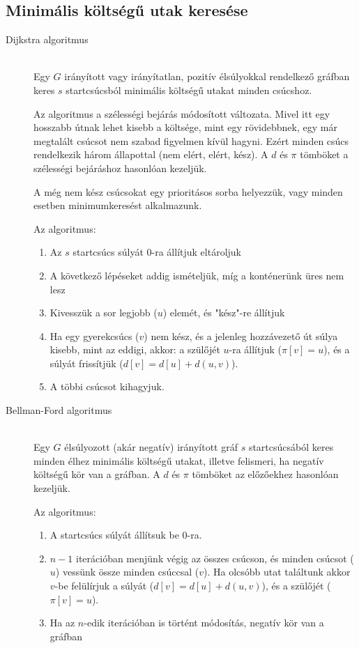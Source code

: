 \documentclass[margin=0px]{article}
\begin{document}
\subsection{Minimális költségű utak keresése}
\begin{description}
    \item[Dijkstra algoritmus] \hfill \\
        Egy $G$ irányított vagy irányítatlan, pozitív élsúlyokkal rendelkező gráfban keres $s$ startcsúcsból minimális költségű utakat minden csúcshoz.

        Az algoritmus a szélességi bejárás módosított változata. Mivel itt egy hosszabb útnak lehet kisebb a költsége, mint egy rövidebbnek, egy már megtalált csúcsot nem szabad figyelmen kívül hagyni. Ezért minden csúcs rendelkezik három állapottal (nem elért, elért, kész). A $d$ és $\pi$ tömböket a szélességi bejáráshoz hasonlóan kezeljük.

        A még nem kész csúcsokat egy prioritásos sorba helyezzük, vagy minden esetben minimumkeresést alkalmazunk.

        Az algoritmus:
        \begin{enumerate}
            \item Az $s$ startcsúcs súlyát 0-ra állítjuk eltároljuk
            \item A következő lépéseket addig ismételjük, míg a konténerünk üres nem lesz
            \item Kivesszük a sor legjobb ($u$) elemét, és "kész"-re állítjuk
            \item Ha egy gyerekcsúcs ($v$) nem kész, és a jelenleg hozzávezető út súlya kisebb, mint az eddigi, akkor: a szülőjét $u$-ra állítjuk ($\pi[v] = u$), és a súlyát frissítjük ($d[v] = d[u]+d(u,v)$).
            \item A többi csúcsot kihagyjuk.
        \end{enumerate}

    \item[Bellman-Ford algoritmus] \hfill \\
        Egy $G$ élsúlyozott (akár negatív) irányított gráf $s$ startcsúcsából keres minden élhez minimális költségű utakat, illetve felismeri, ha negatív költségű kör van a gráfban. A $d$ és $\pi$ tömböket az előzőekhez hasonlóan kezeljük.

        Az algoritmus:
        \begin{enumerate}
            \item A startcsúcs súlyát állítsuk be 0-ra.
            \item $n-1$ iterációban menjünk végig az összes csúcson, és minden csúcsot ($u$) vessünk össze minden csúccsal ($v$). Ha olcsóbb utat találtunk akkor $v$-be felülírjuk a súlyát ($d[v] = d[u]+d(u,v)$), és a szülőjét ($\pi[v] = u$).
            \item Ha az $n$-edik iterációban is történt módosítás, negatív kör van a gráfban
        \end{enumerate}
\end{description}
\end{document}

